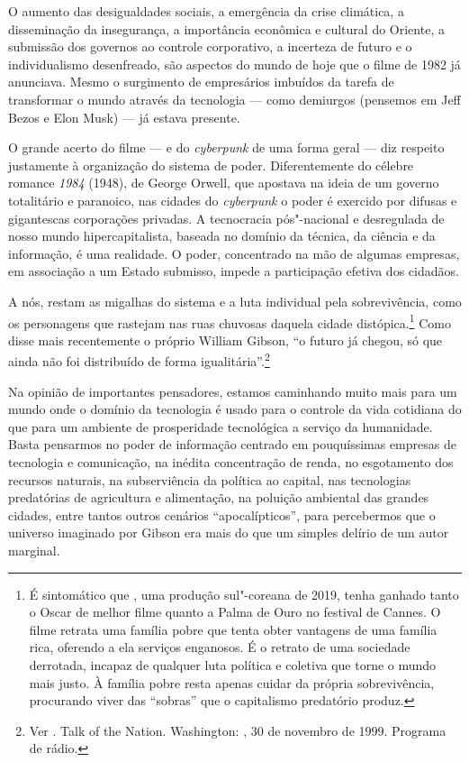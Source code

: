 O aumento das desigualdades sociais, a emergência da crise climática, a disseminação da insegurança, a importância econômica e cultural do Oriente, a submissão dos governos ao controle corporativo, a incerteza de futuro e o individualismo desenfreado, são aspectos do mundo de hoje que o filme de 1982 já anunciava. Mesmo o surgimento de empresários imbuídos da tarefa de transformar o mundo através da tecnologia --- como demiurgos (pensemos em Jeff Bezos e Elon Musk) --- já estava presente.

O grande acerto do filme --- e do \emph{cyberpunk} de uma forma geral --- diz respeito justamente à organização do sistema de poder. Diferentemente do célebre romance \emph{1984} (1948), de George Orwell, que apostava na ideia de um governo totalitário e paranoico, nas cidades do \emph{cyberpunk} o poder é exercido por difusas e gigantescas corporações privadas. A tecnocracia pós"-nacional e desregulada de nosso mundo hipercapitalista, baseada no domínio da técnica, da ciência e da informação, é uma realidade. O poder, concentrado na mão de algumas empresas, em associação a um Estado submisso, impede a participação efetiva dos cidadãos. 

A nós, restam as migalhas do
sistema e a luta individual pela sobrevivência, como os personagens que
rastejam nas ruas chuvosas daquela cidade distópica.\footnote{É sintomático que {}, uma produção sul"-coreana de 2019, tenha ganhado tanto o Oscar de melhor filme quanto a Palma de Ouro no festival de Cannes. O filme retrata uma família pobre que tenta obter vantagens de uma família rica, oferendo a ela serviços enganosos. É o retrato de uma sociedade derrotada, incapaz de qualquer luta política e coletiva que torne o mundo mais justo. À família pobre resta apenas cuidar da própria sobrevivência, procurando viver das ``sobras'' que o capitalismo predatório produz.} Como disse mais recentemente o próprio William Gibson, ``o futuro já chegou, só que ainda não foi distribuído de forma igualitária''.\footnote{Ver . Talk of the Nation. Washington: , 30 de novembro de 1999. Programa de rádio.}

Na opinião de importantes pensadores, estamos caminhando muito mais para
um mundo onde o domínio da tecnologia é usado para o controle da vida
cotidiana do que para um ambiente de prosperidade tecnológica a serviço
da humanidade. Basta pensarmos no poder de informação centrado em
pouquíssimas empresas de tecnologia e comunicação, na inédita
concentração de renda, no esgotamento dos recursos naturais, na
subserviência da política ao capital, nas tecnologias predatórias de
agricultura e alimentação, na poluição ambiental das grandes cidades,
entre tantos outros cenários ``apocalípticos'', para percebermos que o
universo imaginado por Gibson era mais do que um simples delírio de um
autor marginal.

